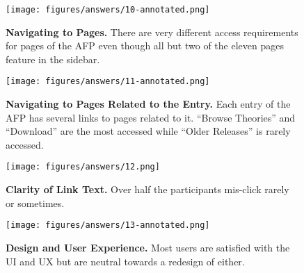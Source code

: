 \documentclass[bsc,frontabs,oneside,singlespacing,parskip,deptreport,logo]{infthesis}
\begin{document}
\begin{figure}[t]
    \centering
    \texttt{[image: figures/answers/10-annotated.png]}
    \caption{\textbf{Navigating to Pages.}
    There are very different access requirements for pages of the AFP even though all but two of the eleven pages feature in the sidebar.}
    \label{fig:navigating-to-pages}
    \medskip
\end{figure}



\begin{figure}[h]
    \centering
    \texttt{[image: figures/answers/11-annotated.png]}
    \caption{\textbf{Navigating to Pages Related to the Entry.}
    Each entry of the AFP has several links to pages related to it. ``Browse Theories'' and ``Download'' are the most accessed while ``Older Releases'' is rarely accessed.}
    \medskip
\end{figure}



\begin{figure}[h]
    \centering
    \texttt{[image: figures/answers/12.png]}
    \caption{\textbf{Clarity of Link Text.}
    Over half the participants mis-click rarely or sometimes.}
    \label{fig:clarity-of-link-text}
    \medskip
\end{figure}

\begin{figure}[h]
    \centering
    \texttt{[image: figures/answers/13-annotated.png]}
    \caption{\textbf{Design and User Experience.}
    Most users are satisfied with the UI and UX but are neutral towards a redesign of either.}
    \medskip
\end{figure}

\end{document}
